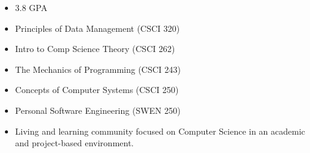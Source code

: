 \begin{itemize}
    \item 3.8 GPA 
  \end{itemize}

\vspace{0.25cm}
\begin{itemize}
    \item Principles of Data Management (CSCI 320)
    \item Intro to Comp Science Theory (CSCI 262)
    \item The Mechanics of Programming (CSCI 243)
    \item Concepts of Computer Systems (CSCI 250)
    \item Personal Software Engineering (SWEN 250)
\end{itemize}

\vspace{0.25cm}

\vspace{0.25cm}

\smallskip
\newline

\vspace{0.25cm}

\begin{itemize}
    \item Living and learning community focused on Computer Science in an academic and project-based environment.
  \end{itemize}
